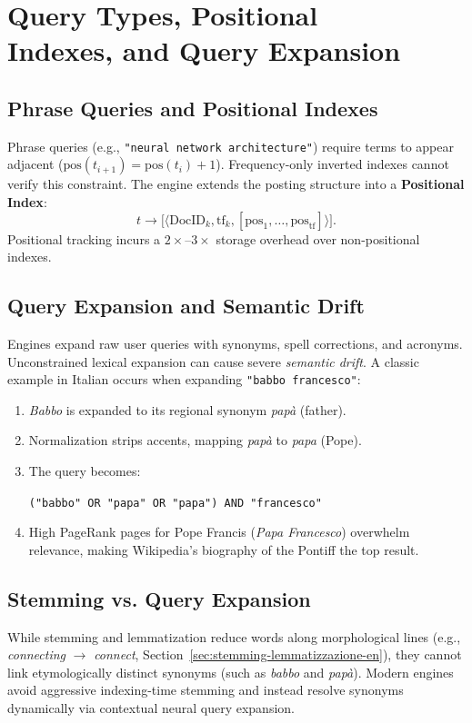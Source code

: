 \FloatBarrier
\section[Query Types and Query Expansion]{Query Types, Positional\\ Indexes, and Query Expansion}
\label{sec:query-expansion-positional-en}

\subsection{Phrase Queries and Positional Indexes}
Phrase queries (e.g., \texttt{"neural network architecture"}) require terms to appear adjacent ($\text{pos}(t_{i+1}) = \text{pos}(t_i) + 1$). Frequency-only inverted indexes cannot verify this constraint. The engine extends the posting structure into a \textbf{Positional Index}:
\begin{equation}
t \longrightarrow \big[ \langle \text{DocID}_k, \text{tf}_k, [\text{pos}_1, \dots, \text{pos}_{\text{tf}}] \rangle \big].
\end{equation}
Positional tracking incurs a $2\times\text{--}3\times$ storage overhead over non-positional indexes.

\subsection{Query Expansion and Semantic Drift}
Engines expand raw user queries with synonyms, spell corrections, and acronyms. Unconstrained lexical expansion can cause severe \textit{semantic drift}. A classic example in Italian occurs when expanding \texttt{"babbo francesco"}:
\begin{enumerate}
    \item \textit{Babbo} is expanded to its regional synonym \textit{pap\`a} (father).
    \item Normalization strips accents, mapping \textit{pap\`a} to \textit{papa} (Pope).
    \item The query becomes:
    \begin{center}
    \texttt{("babbo" OR "pap\textasciigrave a" OR "papa") AND "francesco"}
    \end{center}
    \item High PageRank pages for Pope Francis (\textit{Papa Francesco}) overwhelm relevance, making Wikipedia's biography of the Pontiff the top result.
\end{enumerate}

\subsection{Stemming vs. Query Expansion}
While stemming and lemmatization reduce words along morphological lines (e.g., \textit{connecting} $\to$ \textit{connect}, Section~\ref{sec:stemming-lemmatizzazione-en}), they cannot link etymologically distinct synonyms (such as \textit{babbo} and \textit{pap\`a}). Modern engines avoid aggressive indexing-time stemming and instead resolve synonyms dynamically via contextual neural query expansion.

